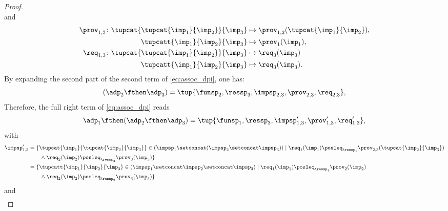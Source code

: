 \begin{proof}
\begin{equation}
    \end{equation}
    and
    \begin{equation}
        \begin{aligned}
            \prov_{1,3} \colon \tupcat {\tupcat {\imp_{1}} {\imp_{2}}} {\imp_{3}}   &\mapsto\prov_{1,2}(\tupcat {\imp_{1}} {\imp_{2}}),\\
            \tupcatt{\imp_{1}}{\imp_{2}}{\imp_{3}}&\mapsto \prov_1(\imp_{1}),\\
            \req_{1,3} \colon \tupcat {\tupcat {\imp_{1}} {\imp_{2}}} {\imp_{3}} &\mapsto\req_{3}(\imp_{3})\\
            \tupcatt{\imp_{1}}{\imp_{2}}{\imp_{3}}&\mapsto\req_{3}(\imp_{3}).
        \end{aligned}
    \end{equation}
    By expanding the second part of the second term of \cref{eq:assoc_dpi}, one has:
    \begin{equation}
    (\adp_{2} \fthen \adp_{3})
        =
        \tup{ \funsp_{2},\ressp_{3},\impsp_{2,3},\prov_{2,3},\req_{2,3}},
    \end{equation}
    Therefore, the full right term of \cref{eq:assoc_dpi} reads
    \begin{equation}
        \label{eq:dpi_ass_2}
        \adp_{1} \fthen (\adp_{2}\fthen \adp_{3})=\tup{ \funsp_{1},\ressp_{3},\impsp'_{1,3},\prov'_{1,3},\req'_{1,3}},
    \end{equation}
    with
    \begin{equation}
        \begin{aligned}
            \impsp_{1,3}'  &=  \{  \tupcat {\imp_{1}} {\tupcat {\imp_{2}} {\imp_{3}}} \in (\impsp_{1} \setconcat (\impsp_{2}\setconcat \impsp_{3}))\mid\req_{1}(\imp_{1})\posleq_{\ressp_{1}}\prov_{2,3}(\tupcat {\imp_{2}} {\imp_{3}})\\
            &\qquad \wedge \req_2(\imp_2)\posleq_{\ressp_2}\prov_3(\imp_3)\}\\
            &=\{  \tupcatt{\imp_{1}}{\imp_{2}}{\imp_{3}} \in (\impsp_{1} \setconcat \impsp_{2}\setconcat \impsp_{3})\mid\req_{1}(\imp_{1})\posleq_{\ressp_{1}}\prov_{2}(\imp_2)\\
            &\qquad \wedge \req_2(\imp_2)\posleq_{\ressp_2}\prov_3(\imp_3)\}\\
        \end{aligned}
    \end{equation}
    and
    \begin{equation}
        \begin{aligned}

\end{aligned}
\end{equation}
\end{proof}
